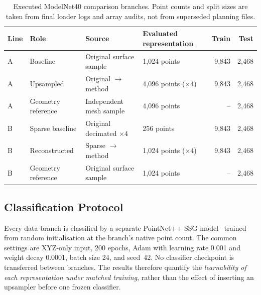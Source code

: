 \begin{table}[htbp]
\centering
\small
\begin{tabularx}{\linewidth}{llXXrr}
\toprule
Line & Role & Source & Evaluated representation & Train & Test \\
\midrule
A & Baseline & Original surface sample & 1,024 points & 9,843 & 2,468 \\
A & Upsampled & Original $\rightarrow$ method & 4,096 points ($\times4$) & 9,843 & 2,468 \\
A & Geometry reference & Independent mesh sample & 4,096 points & -- & 2,468 \\
B & Sparse baseline & Original decimated $\times4$ & 256 points & 9,843 & 2,468 \\
B & Reconstructed & Sparse $\rightarrow$ method & 1,024 points ($\times4$) & 9,843 & 2,468 \\
B & Geometry reference & Original surface sample & 1,024 points & -- & 2,468 \\
\bottomrule
\end{tabularx}
\caption{Executed ModelNet40 comparison branches. Point counts and split sizes are taken from final loader logs and array audits, not from superseded planning files.}
\label{tab:executed-branches}
\end{table}

\subsection{Classification Protocol}

Every data branch is classified by a separate PointNet++ SSG model~\cite{r10} trained from random initialisation at the branch's native point count. The common settings are XYZ-only input, 200 epochs, Adam with learning rate 0.001 and weight decay 0.0001, batch size 24, and seed~42. No classifier checkpoint is transferred between branches. The results therefore quantify the \emph{learnability of each representation under matched training}, rather than the effect of inserting an upsampler before one frozen classifier.

